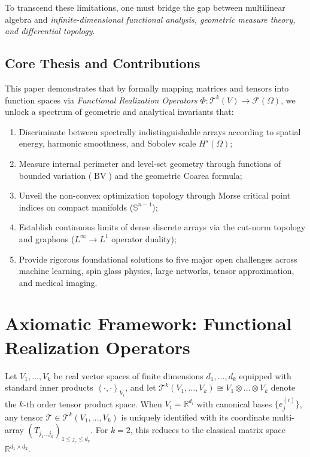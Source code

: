 \documentclass[11pt,a4paper,reqno]{amsart}
\theoremstyle{definition}
\numberwithin{equation}{section}
\newcommand{\R}{\mathbb{R}}
\newcommand{\Sph}{\mathbb{S}}
\newcommand{\BV}{\operatorname{BV}}
\newcommand{\inner}[2]{\left\langle #1, #2 \right\rangle}
\begin{document}
To transcend these limitations, one must bridge the gap between multilinear algebra and \emph{infinite-dimensional functional analysis, geometric measure theory, and differential topology}. 

\subsection*{Core Thesis and Contributions}
This paper demonstrates that by formally mapping matrices and tensors into function spaces via \emph{Functional Realization Operators} $\Phi \colon \mathcal{T}^k(V) \to \mathcal{F}(\Omega)$, we unlock a spectrum of geometric and analytical invariants that:
\begin{enumerate}[label=\arabic*.]
    \item Discriminate between spectrally indistinguishable arrays according to spatial energy, harmonic smoothness, and Sobolev scale $H^s(\Omega)$;
    \item Measure internal perimeter and level-set geometry through functions of bounded variation ($\BV$) and the geometric Coarea formula;
    \item Unveil the non-convex optimization topology through Morse critical point indices on compact manifolds ($\Sph^{n-1}$);
    \item Establish continuous limits of dense discrete arrays via the cut-norm topology and graphons ($L^\infty \to L^1$ operator duality);
    \item Provide rigorous foundational solutions to five major open challenges across machine learning, spin glass physics, large networks, tensor approximation, and medical imaging.
\end{enumerate}

\section{Axiomatic Framework: Functional Realization Operators}
\label{sec:framework}

Let $V_1, \dots, V_k$ be real vector spaces of finite dimensions $d_1, \dots, d_k$ equipped with standard inner products $\inner{\cdot}{\cdot}_{V_i}$, and let $\mathcal{T}^k(V_1, \dots, V_k) \cong V_1 \otimes \dots \otimes V_k$ denote the $k$-th order tensor product space. When $V_i = \R^{d_i}$ with canonical bases $\{e_{j}^{(i)}\}$, any tensor $\mathcal{T} \in \mathcal{T}^k(V_1, \dots, V_k)$ is uniquely identified with its coordinate multi-array $(T_{j_1 \dots j_k})_{1 \le j_r \le d_r}$. For $k=2$, this reduces to the classical matrix space $\R^{d_1 \times d_2}$.
\end{document}
